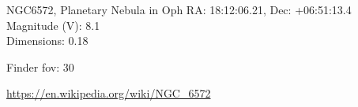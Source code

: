 \begin{block}{NGC6572, Planetary Nebula in Oph}
    RA: 18:12:06.21, Dec: +06:51:13.4 \\ 
    Magnitude (V): 8.1 \\ 
    Dimensions: 0.18 

    Finder fov: 30 

    \url{https://en.wikipedia.org/wiki/NGC_6572} 
\end{block}